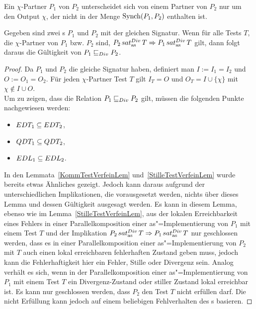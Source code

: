 Ein $\chi$-Partner $P_1$ von $P_2$ unterscheidet sich von einem Partner von
$P_2$ nur um den Output $\chi$, der nicht in der Menge $\mathrm{Synch} (P_1,P_2)$
enthalten ist.

\begin{Lem}
  \label{DivTestVerfeinLem}
  Gegeben sind zwei \MEIO{}s $P_1$ und $P_2$ mit der gleichen Signatur. Wenn
  für alle Tests $T$, die $\chi$-Partner von $P_1$ bzw. $P_2$ sind, $P_2
  \hspace{0.05cm}sat_\mathrm{as}^{Div}\hspace{0.05cm} T\Rightarrow P_1 \hspace{0.05cm}sat_\mathrm{as}^{Div}\hspace{0.05cm} T$ gilt, dann folgt daraus die Gültigkeit
  von $P_1 \sqsubseteq  _{Div} P_2$.
\end{Lem}
\begin{proof}
  Da $P_1$ und $P_2$ die gleiche Signatur haben, definiert man $I:=I_1=I_2$ und
  $O:=O_1=O_2$. Für jeden $\chi$-Partner Test $T$ gilt $I_T=O$ und
  $O_T=I\cup\{\chi\}$ mit $\chi\notin I\cup O$.\\
  Um zu zeigen, dass die Relation $P_1 \sqsubseteq  _{Div} P_2$ gilt, müssen die folgenden
  Punkte nachgewiesen werden:
  \begin{itemize}
    \item $EDT _1\subseteq EDT _2$,
    \item $QDT _1\subseteq QDT _2$,
    \item $EDL _1\subseteq EDL _2$.
  \end{itemize}
  In den Lemmata~\ref{KommTestVerfeinLem} und~\ref{StilleTestVerfeinLem} wurde
  bereits etwas Ähnliches gezeigt. Jedoch kann daraus aufgrund der
  unterschiedlichen Implikationen, die vorausgesetzt werden, nichts über dieses
  Lemma und dessen Gültigkeit ausgesagt werden. Es kann in diesem Lemma, ebenso
  wie im Lemma~\ref{StilleTestVerfeinLem}, aus der lokalen Erreichbarkeit eines
  Fehlers in einer Parallelkomposition einer as"=Implementierung von $P_1$ mit
  einem Test $T$ und der Implikation $P_2 \hspace{0.05cm}sat_\mathrm{as}^{Div}\hspace{0.05cm} T\Rightarrow P_1 \hspace{0.05cm}sat_\mathrm{as}^{Div}\hspace{0.05cm} T$
  nur geschlossen werden, dass es in einer Parallelkomposition einer
  as"=Implementierung von $P_2$ mit $T$ auch einen lokal erreichbaren
  fehlerhaften Zustand geben muss, jedoch kann die Fehlerhaftigkeit hier ein
  Fehler, Stille oder Divergenz sein. Analog verhält es sich, wenn in der
  Parallelkomposition einer as"=Implementierung von $P_1$ mit einem Test $T$
  ein Divergenz-Zustand oder stiller Zustand lokal erreichbar ist. Es kann nur
  geschlossen werden, dass $P_2$ den Test $T$ nicht erfüllen darf. Die nicht
  Erfüllung kann jedoch auf einem beliebigen Fehlverhalten des \MEIO{}s
  basieren.


\end{proof}
